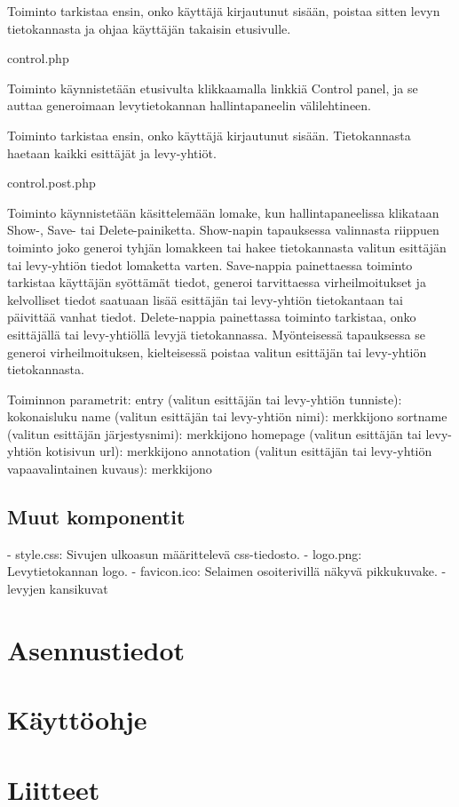 \documentclass[a4paper,12pt]{report}
\begin{document}
Toiminto tarkistaa ensin, onko käyttäjä kirjautunut sisään, poistaa sitten levyn tietokannasta ja ohjaa käyttäjän takaisin etusivulle.


control.php

Toiminto käynnistetään etusivulta klikkaamalla linkkiä Control panel, ja se auttaa generoimaan levytietokannan hallintapaneelin välilehtineen.

Toiminto tarkistaa ensin, onko käyttäjä kirjautunut sisään. Tietokannasta haetaan kaikki esittäjät ja levy-yhtiöt.


control.post.php

Toiminto käynnistetään käsittelemään lomake, kun hallintapaneelissa klikataan Show-, Save- tai Delete-painiketta. 
Show-napin tapauksessa valinnasta riippuen toiminto joko generoi tyhjän lomakkeen tai hakee tietokannasta valitun esittäjän tai levy-yhtiön tiedot lomaketta varten. 
Save-nappia painettaessa toiminto tarkistaa käyttäjän syöttämät tiedot, generoi tarvittaessa virheilmoitukset ja kelvolliset tiedot saatuaan lisää esittäjän tai levy-yhtiön tietokantaan tai päivittää vanhat tiedot. 
Delete-nappia painettassa toiminto tarkistaa, onko esittäjällä tai levy-yhtiöllä levyjä tietokannassa. Myönteisessä tapauksessa se generoi virheilmoituksen, kielteisessä poistaa valitun esittäjän tai levy-yhtiön tietokannasta.

Toiminnon parametrit:
	entry (valitun esittäjän tai levy-yhtiön tunniste): kokonaisluku
	name (valitun esittäjän tai levy-yhtiön nimi): merkkijono
	sortname (valitun esittäjän järjestysnimi): merkkijono
	homepage (valitun esittäjän tai levy-yhtiön kotisivun url): merkkijono
	annotation (valitun esittäjän tai levy-yhtiön vapaavalintainen kuvaus): merkkijono
	
\subsection{Muut komponentit}

- style.css: Sivujen ulkoasun määrittelevä css-tiedosto.
- logo.png: Levytietokannan logo.
- favicon.ico: Selaimen osoiterivillä näkyvä pikkukuvake.
- levyjen kansikuvat

\section{Asennustiedot}

\section{Käyttöohje}

\section{Liitteet}
\end{document}
